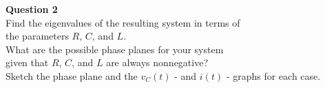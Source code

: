 \documentclass[preview]{standalone}
\begin{document}
\begin{center}
\textbf{Question 2} \\[10pt]
                    Find the eigenvalues of the resulting system in terms of \\ the parameters $R$, $C$, and
                    $L$. \\ What are the possible phase planes for your system \\ given that $R$, $C$, and $L$ are
                    always nonnegative?\\ Sketch the phase plane and the $v_C(t)$ - and $i(t)$ - graphs for each case.
\end{center}
\end{document}
